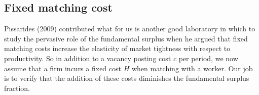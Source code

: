 

\subsection{Fixed matching cost}
Pissarides (2009) contributed what for us is  another good laboratory in which to study the pervasive role
of the fundamental surplus  when he argued that fixed
matching costs increase the elasticity of market
tightness with respect to productivity. So in addition to a vacancy posting cost $c$ per period,
we now assume that a firm incurs a fixed cost $H$ when matching
with a worker. Our job is  to verify that the addition of these
 costs diminishes the fundamental surplus fraction.


